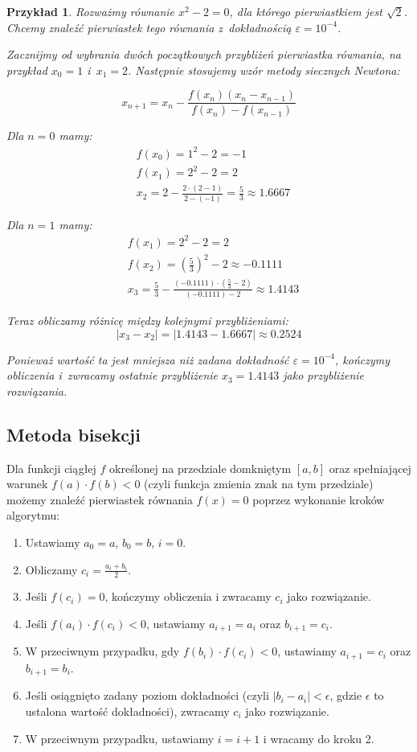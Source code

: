 \documentclass[12pt]{article}
\newtheorem{example}{Przykład}
\begin{document}
\begin{example}
Rozważmy równanie $x^2 - 2 = 0$, dla którego pierwiastkiem jest $\sqrt{2}$. Chcemy znaleźć pierwiastek tego równania z~dokładnością $\varepsilon = 10^{-4}$.

Zacznijmy od wybrania dwóch początkowych przybliżeń pierwiastka równania, na przykład $x_0 = 1$ i~$x_1 = 2$. Następnie stosujemy wzór metody siecznych Newtona:

$$x_{n+1} = x_n - \frac{f(x_n)(x_n-x_{n-1})}{f(x_n)-f(x_{n-1})}$$

Dla $n=0$ mamy:
\begin{align*}
    &f(x_0) = 1^2 - 2 = -1\\
    &f(x_1) = 2^2 - 2 = 2\\
    &x_{2} = 2 - \frac{2\cdot (2-1)}{2-(-1)} = \frac{5}{3} \approx 1.6667
\end{align*}


Dla $n=1$ mamy:
\begin{align*}
    &f(x_1) = 2^2 - 2 = 2\\
    &f(x_2) = \left(\frac{5}{3}\right)^2 - 2 \approx -0.1111\\
    &x_{3} = \frac{5}{3} - \frac{(-0.1111) \cdot \left(\frac{5}{3}-2\right)}{(-0.1111)-2} \approx 1.4143
\end{align*}

Teraz obliczamy różnicę między kolejnymi przybliżeniami:
$$|x_{3} - x_{2}| = |1.4143 - 1.6667| \approx 0.2524$$

Ponieważ wartość ta jest mniejsza niż zadana dokładność $\varepsilon = 10^{-4}$, kończymy obliczenia i~zwracamy ostatnie przybliżenie $x_3 = 1.4143$ jako przybliżenie rozwiązania.
\end{example}

\subsection{Metoda bisekcji}
Dla funkcji ciągłej $f$ określonej na przedziale domkniętym $[a,b]$ oraz spełniającej warunek $f(a) \cdot f(b) < 0$ (czyli funkcja zmienia znak na tym przedziale) możemy znaleźć pierwiastek równania $f(x) = 0$ poprzez wykonanie kroków algorytmu:

\begin{enumerate}
\item Ustawiamy $a_0 = a$, $b_0 = b$, $i = 0$.
\item Obliczamy $c_i = \frac{a_i + b_i}{2}$.
\item Jeśli $f(c_i) = 0$, kończymy obliczenia i zwracamy $c_i$ jako rozwiązanie.
\item Jeśli $f(a_i) \cdot f(c_i) < 0$, ustawiamy $a_{i+1} = a_i$ oraz $b_{i+1} = c_i$.
\item W przeciwnym przypadku, gdy $f(b_i) \cdot f(c_i) < 0$, ustawiamy $a_{i+1} = c_i$ oraz $b_{i+1} = b_i$.
\item Jeśli osiągnięto zadany poziom dokładności (czyli $|b_i - a_i| < \epsilon$, gdzie $\epsilon$ to ustalona wartość dokładności), zwracamy $c_i$ jako rozwiązanie.
\item W przeciwnym przypadku, ustawiamy $i = i + 1$ i wracamy do kroku 2.
\end{enumerate}
\end{document}
